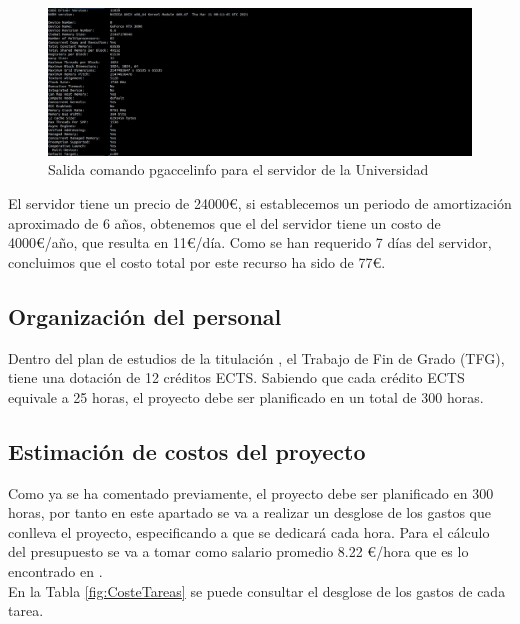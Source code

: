 \begin{figure}[H]
    \centering
    \includegraphics[width=\textwidth]{img/pgaccelinfoServer.jpeg}
    \caption{Salida comando pgaccelinfo para el servidor de la Universidad}
    \label{fig:GPUServer}
\end{figure}

El servidor tiene un precio de 24000€, si establecemos un periodo de amortización aproximado de 6 años, obtenemos que el del servidor tiene un costo de 4000€/año, que resulta en 11€/día. Como se han requerido 7 días del servidor, concluimos que el costo total por este recurso ha sido de 77€.\\ 

\subsection{Organización del personal}
Dentro del plan de estudios de la titulación \cite{unknown-author-no-dateC}, el Trabajo de Fin de Grado (TFG), tiene una dotación de 12 créditos ECTS. Sabiendo que cada crédito ECTS equivale a 25 horas, el proyecto debe ser planificado en un total de 300 horas.\\


\subsection{Estimación de costos del proyecto}

Como ya se ha comentado previamente, el proyecto debe ser planificado en 300 horas, por tanto en este apartado se va a realizar un desglose de los gastos que conlleva el proyecto, especificando a que se dedicará cada hora. Para el cálculo del presupuesto se va a tomar como salario promedio 8.22 €/hora que es lo encontrado en \cite{unknown-author-2021C}.\\ En la Tabla \ref{fig:CosteTareas} se puede consultar el desglose de los gastos de cada tarea.


